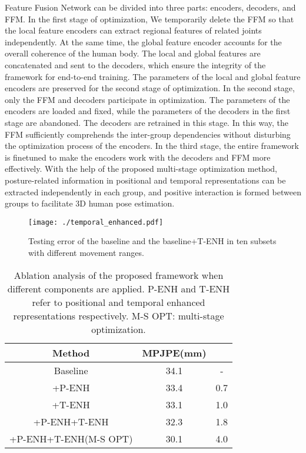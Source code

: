 \documentclass[sigconf]{acmart}
\begin{document}
Feature Fusion Network can be divided into three parts: encoders, decoders, and FFM. In the first stage of optimization, We temporarily delete the FFM so that the local feature encoders can extract regional features of related joints independently. At the same time, the global feature encoder accounts for the overall coherence of the human body. The local and global features are concatenated and sent to the decoders, which ensure the integrity of the framework for end-to-end training. The parameters of the local and global feature encoders are preserved for the second stage of optimization. In the second stage, only the FFM and decoders participate in optimization. The parameters of the encoders are loaded and fixed, while the parameters of the decoders in the first stage are abandoned. The decoders are retrained in this stage. In this way, the FFM sufficiently comprehends the inter-group dependencies without disturbing the optimization process of the encoders. In the third stage, the entire framework is finetuned to make the encoders work with the decoders and FFM more effectively. With the help of the proposed multi-stage optimization method, posture-related information in positional and temporal representations can be extracted independently in each group, and positive interaction is formed between groups to facilitate 3D human pose estimation.


\begin{figure}
  \centering
  \texttt{[image: ./temporal\_enhanced.pdf]}
  \vspace{-0.5cm}
  \caption{Testing error of the baseline and the baseline+T-ENH in ten subsets with different movement ranges.}
  \label{img7}
\end{figure}



\begin{table}
  \centering
  \caption{Ablation analysis of the proposed framework when different components are applied. P-ENH and T-ENH refer to positional and temporal enhanced representations respectively. M-S OPT: multi-stage optimization.}
\begin{tabular}{ccc}
    \toprule
    Method & MPJPE(mm)  &  \\
    \midrule
    Baseline & 34.1&-  \\
    +P-ENH & 33.4&0.7  \\
    +T-ENH & 33.1&1.0  \\
    +P-ENH+T-ENH &32.3&1.8 \\
    +P-ENH+T-ENH(M-S OPT)&30.1 & 4.0\\
    \bottomrule
    \end{tabular}
  \label{tab4}
  \vspace{-0.3cm}
\end{table}
\end{document}
